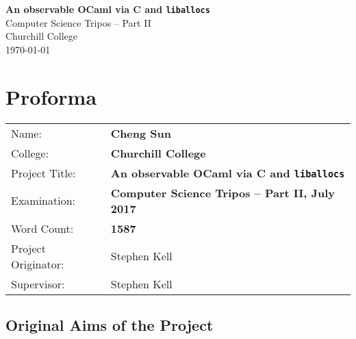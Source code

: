 \documentclass[12pt,a4paper,twoside,openright]{report}
\begin{document}





\pagestyle{empty}


\vspace*{60mm}
\begin{center}
\Huge
\textbf{An observable OCaml via C and \texttt{liballocs}} \\[5mm]
Computer Science Tripos -- Part II \\[5mm]
Churchill College \\[5mm]
\today  %
\end{center}


\pagestyle{plain}

\chapter*{Proforma}

{\large
\begin{tabular}{ll}
Name:               & \bf Cheng Sun                       \\
College:            & \bf Churchill College                     \\
Project Title:      & \bf An observable OCaml via C and \texttt{liballocs} \\
Examination:        & \bf Computer Science Tripos -- Part II, July 2017  \\
Word Count:         & \bf 1587\footnotemark[1] \\
Project Originator: & Stephen Kell                    \\
Supervisor:         & Stephen Kell                    \\
\end{tabular}
}


\section*{Original Aims of the Project}

\end{document}
